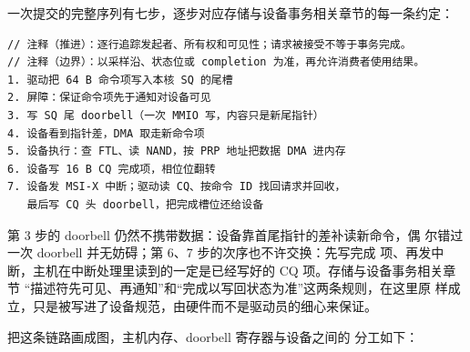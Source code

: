 一次提交的完整序列有七步，逐步对应存储与设备事务相关章节的每一条约定：

\begin{lstlisting}
// 注释（推进）：逐行追踪发起者、所有权和可见性；请求被接受不等于事务完成。
// 注释（边界）：以采样沿、状态位或 completion 为准，再允许消费者使用结果。
1. 驱动把 64 B 命令项写入本核 SQ 的尾槽
2. 屏障：保证命令项先于通知对设备可见
3. 写 SQ 尾 doorbell（一次 MMIO 写，内容只是新尾指针）
4. 设备看到指针差，DMA 取走新命令项
5. 设备执行：查 FTL、读 NAND，按 PRP 地址把数据 DMA 进内存
6. 设备写 16 B CQ 完成项，相位位翻转
7. 设备发 MSI-X 中断；驱动读 CQ、按命令 ID 找回请求并回收，
   最后写 CQ 头 doorbell，把完成槽位还给设备
\end{lstlisting}

第 3 步的 doorbell 仍然不携带数据：设备靠首尾指针的差补读新命令，偶
尔错过一次 doorbell 并无妨碍；第 6、7 步的次序也不许交换：先写完成
项、再发中断，主机在中断处理里读到的一定是已经写好的 CQ 项。存储与设备事务相关章节
“描述符先可见、再通知”和“完成以写回状态为准”这两条规则，在这里原
样成立，只是被写进了设备规范，由硬件而不是驱动员的细心来保证。

把这条链路画成图，主机内存、doorbell 寄存器与设备之间的
分工如下：

